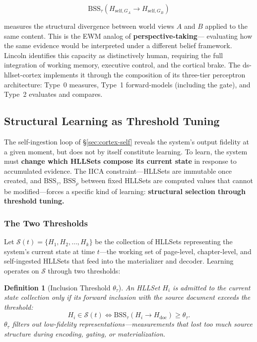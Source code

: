 \documentclass[11pt,a4paper]{article}
\newtheorem{definition}{Definition}[section]
\theoremstyle{remark}
\begin{document}
\begin{equation}
  \text{BSS}_{\tau}(H_{\text{self}, G_A} \to H_{\text{self}, G_B})
\end{equation}

measures the structural divergence between world views $A$ and $B$ applied to
the same content. This is the EWM analog of \textbf{perspective-taking}---
evaluating how the same evidence would be interpreted under a different belief
framework. Lincoln identifies this capacity as distinctively human, requiring
the full integration of working memory, executive control, and the cortical
brake. The ds-hllset-cortex implements it through the composition of its
three-tier perceptron architecture: Type~0 measures, Type~1 forward-models
(including the gate), and Type~2 evaluates and compares.

\subsection{Structural Learning as Threshold Tuning}
\label{sec:cortex-learning}

The self-ingestion loop of \S\ref{sec:cortex-self} reveals the system's
output fidelity at a given moment, but does not by itself constitute learning.
To learn, the system must \textbf{change which HLLSets compose its current
state} in response to accumulated evidence. The IICA constraint---HLLSets are
immutable once created, and $\text{BSS}_{\tau}$, $\text{BSS}_{\rho}$
between fixed HLLSets are computed values that cannot be modified---forces a
specific kind of learning: \textbf{structural selection through threshold
tuning.}

\subsubsection{The Two Thresholds}

Let $\mathcal{S}(t) = \{H_1, H_2, \ldots, H_k\}$ be the collection of
HLLSets representing the system's current state at time $t$---the working set
of page-level, chapter-level, and self-ingested HLLSets that feed into the
materializer and decoder. Learning operates on $\mathcal{S}$ through two
thresholds:

\begin{definition}[Inclusion Threshold $\theta_{\tau}$]
An HLLSet $H_i$ is admitted to the current state collection only if its
forward inclusion with the source document exceeds the threshold:
\begin{equation}
  H_i \in \mathcal{S}(t) \iff \text{BSS}_{\tau}(H_i \to H_{\text{doc}})
  \geq \theta_{\tau}.
\end{equation}
$\theta_{\tau}$ filters out low-fidelity representations---measurements
that lost too much source structure during encoding, gating, or
materialization.
\end{definition}
\end{document}
